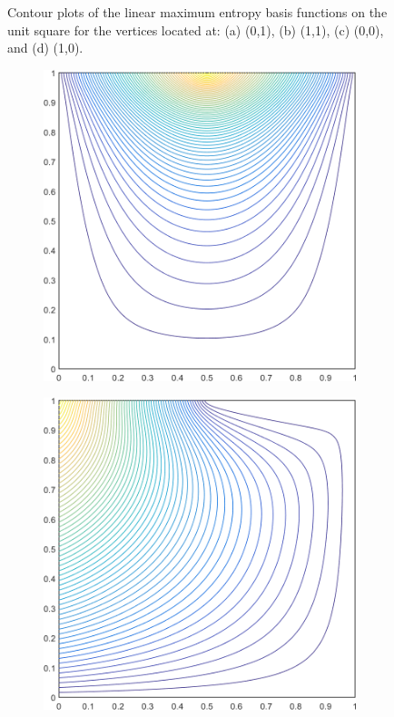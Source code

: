 \begin{figure}
\begin{subfigure}[b]{0.39\textwidth}
		\caption{}
	\end{subfigure}
\caption{Contour plots of the linear maximum entropy basis functions on the unit square for the vertices located at: (a) (0,1), (b) (1,1), (c) (0,0), and (d) (1,0).}
\label{fig::2D_MAXENT1_unit_square_basis_functions}
\end{figure}

\begin{figure}
\centering
	\begin{subfigure}[b]{0.39\textwidth}
		\centering
		\includegraphics[width=\textwidth]{figures/sec_BF/deg_square_MAXENT1_contour_b4.png}
		\caption{}
	\end{subfigure}
	\vfill
	\begin{subfigure}[b]{0.39\textwidth}
		\centering
		\includegraphics[width=\textwidth]{figures/sec_BF/deg_square_MAXENT1_contour_b5.png}

\end{subfigure}
\end{figure}
